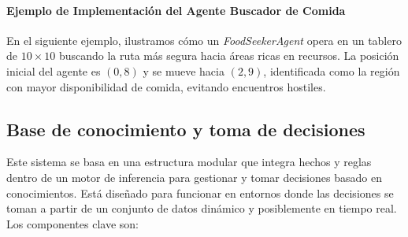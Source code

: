 \documentclass[11pt]{article}
\begin{document}
\paragraph{Ejemplo de Implementación del Agente Buscador de Comida}
En el siguiente ejemplo, ilustramos cómo un \textit{FoodSeekerAgent} opera en un tablero de \(10 \times 10\) buscando la ruta más segura hacia áreas ricas en recursos. La posición inicial del agente es \( (0, 8) \) y se mueve hacia \( (2, 9) \), identificada como la región con mayor disponibilidad de comida, evitando encuentros hostiles.

\subsection{Base de conocimiento y toma de decisiones}
Este sistema se basa en una estructura modular que integra hechos y reglas dentro de un motor de inferencia para gestionar y tomar decisiones basado en conocimientos. Está diseñado para funcionar en entornos donde las decisiones se toman a partir de un conjunto de datos dinámico y posiblemente en tiempo real. Los componentes clave son:
\end{document}
